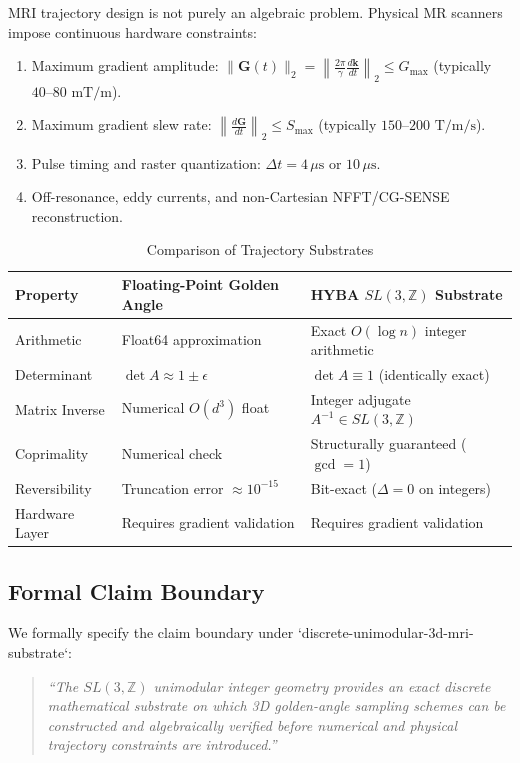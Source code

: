 \documentclass{article}
\theoremstyle{remark}
\begin{document}
MRI trajectory design is not purely an algebraic problem. Physical MR scanners impose continuous hardware constraints:
\begin{enumerate}
    \item Maximum gradient amplitude: $\|\mathbf{G}(t)\|_2 = \left\| \frac{2\pi}{\gamma} \frac{d\mathbf{k}}{dt} \right\|_2 \le G_{\max}$ (typically $40\text{--}80\text{ mT/m}$).
    \item Maximum gradient slew rate: $\left\| \frac{d\mathbf{G}}{dt} \right\|_2 \le S_{\max}$ (typically $150\text{--}200\text{ T/m/s}$).
    \item Pulse timing and raster quantization: $\Delta t = 4\,\mu\text{s}$ or $10\,\mu\text{s}$.
    \item Off-resonance, eddy currents, and non-Cartesian NFFT/CG-SENSE reconstruction.
\end{enumerate}

\begin{table}[h]
\centering
\caption{Comparison of Trajectory Substrates}
\begin{tabular}{lll}
\toprule
\textbf{Property} & \textbf{Floating-Point Golden Angle} & \textbf{HYBA $SL(3,\mathbb{Z})$ Substrate} \\
\midrule
Arithmetic & Float64 approximation & Exact $O(\log n)$ integer arithmetic \\
Determinant & $\det A \approx 1 \pm \epsilon$ & $\det A \equiv 1$ (identically exact) \\
Matrix Inverse & Numerical $O(d^3)$ float & Integer adjugate $A^{-1} \in SL(3,\mathbb{Z})$ \\
Coprimality & Numerical check & Structurally guaranteed ($\gcd=1$) \\
Reversibility & Truncation error $\approx 10^{-15}$ & Bit-exact ($\Delta = 0$ on integers) \\
Hardware Layer & Requires gradient validation & Requires gradient validation \\
\bottomrule
\end{tabular}
\end{table}

\subsection{Formal Claim Boundary}

We formally specify the claim boundary under `discrete-unimodular-3d-mri-substrate`:
\begin{quote}
\textit{``The $SL(3,\mathbb{Z})$ unimodular integer geometry provides an exact discrete mathematical substrate on which 3D golden-angle sampling schemes can be constructed and algebraically verified before numerical and physical trajectory constraints are introduced.''}
\end{quote}
\end{document}
